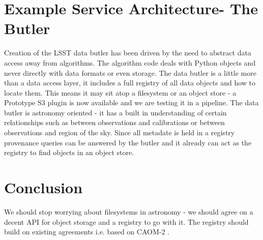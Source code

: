 \section{Example Service Architecture- The Butler}
Creation of the LSST data butler \citep{2018arXiv181208085J} has been driven by the need to abstract data access away from algorithms.
The algorithm code deals with Python objects and never directly with data formats or even storage. The data butler is a little more than a data access layer, it includes a full registry of all data objects and how to locate them. This means it may sit atop a filesystem or an object store - a Prototype S3 plugin is now available and we are testing it in a pipeline.  The data butler is astronomy oriented - it has a built in understanding of certain relationships such as between observations and calibrations or between observations and region of the sky. Since all metadate is held in a registry provenance queries can be answered by the butler and it already can act as the registry to find objects in an object store.

\section{Conclusion}
We should stop worrying about filesystems in astronomy - we should agree on a decent API for object storage and a registry to go with it.
The registry should build on existing agreements i.e. based on CAOM-2 \citep{2007ASPC..376..347D}.
